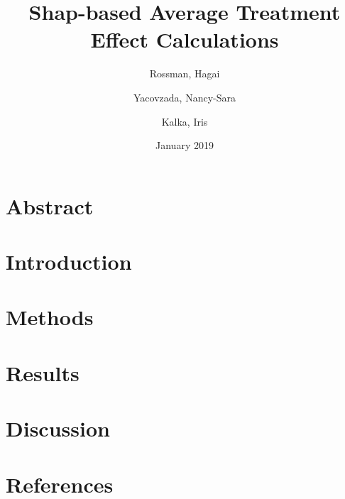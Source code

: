\documentclass{article}
\title{Shap-based Average Treatment Effect Calculations}
\author{Rossman, Hagai
        \and
        Yacovzada, Nancy-Sara
        \and
        Kalka, Iris}
\date{January 2019}
\begin{document}
\maketitle

\section{Abstract}

\section{Introduction}

\section{Methods}

\section{Results}

\section{Discussion}

\section{References}
\end{document}
